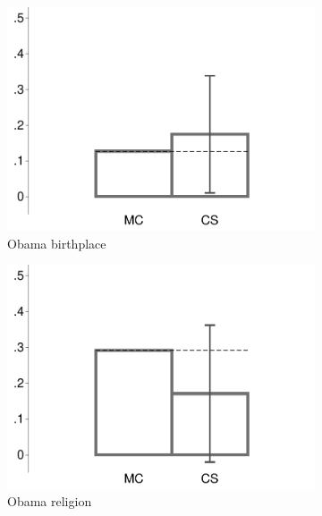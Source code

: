 \begin{figure}[t]
	\caption{Confidence Scoring vs. FSR (MTurk 1)}	
	\centering
	\begin{subfigure}{.325\textwidth}\centering
		\includegraphics[width=\textwidth]{../figs/confidence_score_ccd_fsr_fsr_birth_study1.pdf}
		\caption{Obama birthplace}
	\end{subfigure}
	\hfill
	\begin{subfigure}{.325\textwidth}\centering
		\includegraphics[width=\textwidth]{../figs/confidence_score_ccd_fsr_fsr_religion_study1.pdf}
		\caption{Obama religion}
	\end{subfigure}	
	\hfill
	\begin{subfigure}{.325\textwidth}\centering

\end{subfigure}
\end{figure}
